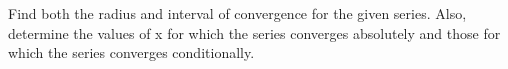\documentclass[week=11]{homework}
\begin{document}
\begin{questions}
		\question
		Find both the radius and interval of convergence for the given series. Also, determine the values of x for which the series converges absolutely and those for which the series converges conditionally. 
     \end{questions}
\end{document}
